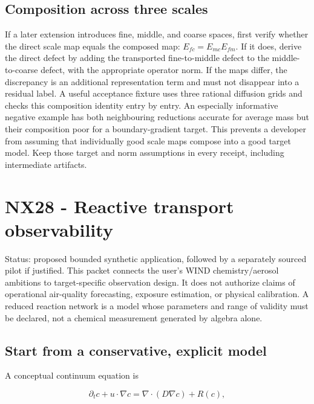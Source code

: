 \documentclass[
  11pt,
  a4paper,
]{report}
\begin{document}
\hypertarget{composition-across-three-scales}{%
\section{Composition across three
scales}\label{composition-across-three-scales}}

If a later extension introduces fine, middle, and coarse spaces, first
verify whether the direct scale map equals the composed map:
\(E_{fc}=E_{mc}E_{fm}\). If it does, derive the direct defect by adding
the transported fine-to-middle defect to the middle-to-coarse defect,
with the appropriate operator norm. If the maps differ, the discrepancy
is an additional representation term and must not disappear into a
residual label. A useful acceptance fixture uses three rational
diffusion grids and checks this composition identity entry by entry. An
especially informative negative example has both neighbouring reductions
accurate for average mass but their composition poor for a
boundary-gradient target. This prevents a developer from assuming that
individually good scale maps compose into a good target model. Keep
those target and norm assumptions in every receipt, including
intermediate artifacts.

\hypertarget{nx28---reactive-transport-observability}{%
\chapter{NX28 - Reactive transport
observability}\label{nx28---reactive-transport-observability}}

Status: proposed bounded synthetic application, followed by a separately
sourced pilot if justified. This packet connects the user's WIND
chemistry/aerosol ambitions to target-specific observation design. It
does not authorize claims of operational air-quality forecasting,
exposure estimation, or physical calibration. A reduced reaction network
is a model whose parameters and range of validity must be declared, not
a chemical measurement generated by algebra alone.

\hypertarget{start-from-a-conservative-explicit-model}{%
\section{Start from a conservative, explicit
model}\label{start-from-a-conservative-explicit-model}}

A conceptual continuum equation is

\[
 \partial_t c+u\cdot\nabla c=\nabla\cdot(D\nabla c)+R(c),
\]
\end{document}
